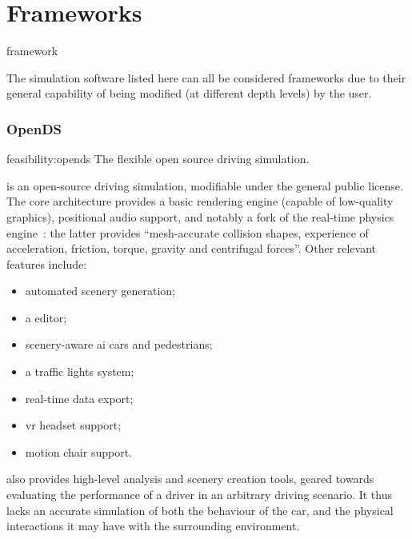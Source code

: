 \section{Frameworks}\label{sc:feasibility:frameworks}

\begin{definition}{framework}
\end{definition}

The simulation software listed here can all be considered \glspl{framework} due to their general capability of being modified (at different depth levels) by the user.

\subsubsection{OpenDS}

\begin{excerpt}{feasibility:opends}
    The flexible open source driving simulation.
\end{excerpt}

 is an open-source driving simulation, modifiable under the  general public license. The core architecture provides a basic rendering engine (capable of low-quality graphics), positional audio support, and notably a  fork of the  real-time physics engine~\cite{feasibility:bullet}: the latter provides \enquote{mesh-accurate collision shapes, experience of acceleration, friction, torque, gravity and centrifugal forces}{\cite{feasibility:opendsfeatures}}. Other relevant features include:

\begin{itemize}
    \item automated scenery generation;
    \item a  editor;
	\item scenery-aware \gls{ai} cars and pedestrians;
    \item a traffic lights system;
    \item real-time data export;
    \item {} \gls{vr} headset support;
    \item motion chair support.
\end{itemize}

 also provides high-level analysis and scenery creation tools, geared towards evaluating the performance of a driver in an arbitrary driving scenario. It thus lacks an accurate simulation of both the behaviour of the car, and the physical interactions it may have with the surrounding environment.

